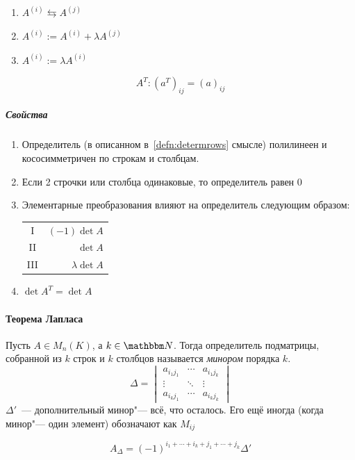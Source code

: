\documentclass[12pt]{../../../notes}
\begin{document}
\begin{defn}\label{defn:elemtranf}
  \noindent\newline\par
  \begin{enumerate}[I]
    \item\label{it:transfchng}    
      $A^{(i)} \leftrightarrows A^{(j)}$     
    \item\label{it:transfaddmul}  
      $A^{(i)} := A^{(i)} + \lambda A^{(j)}$ 
    \item\label{it:transfmul}           
      $A^{(i)} := \lambda A^{(i)}$           
  \end{enumerate}
\end{defn}
\begin{defn}\label{defn:transpose}
  \[
    A^T \colon (a^T)_{ij} = (a)_{ij}
  \]
\end{defn}

\subparagraph{Свойства}
\begin{enumerate}
  \item Определитель (в описанном в~\ref{defn:determrows} смысле) полилинеен и кососимметричен по
    строкам и столбцам.
  \item Если 2 строчки или столбца одинаковые, то определитель равен 0
  \item Элементарные преобразования влияют на определитель следующим образом:\par
    \begin{tabular}{c|r}
      I   & $(-1)\det A$ \\
      II  & $\det A$     \\
      III & $\lambda \det A$
    \end{tabular}
  \item $\det A^T = \det A$
\end{enumerate}


\paragraph{Теорема Лапласа}
\begin{defn}[Минор]\label{defn:minor}
  Пусть $A\in M_n(K)$, а $k\in \N$. Тогда определитель подматрицы, собранной из $k$ строк и $k$
  столбцов называется \emph{минором} порядка $k$.
  \[
    \Delta = 
    \begin{vmatrix}
      a_{i_1j_1} & \cdots & a_{i_1j_k} \\
      \vdots & \ddots & \vdots \\
      a_{i_kj_1} & \cdots & a_{i_kj_k} 
    \end{vmatrix}
  \]
  $\Delta'$~--- дополнительный минор"--- всё, что осталось.
  Его ещё иногда (когда минор"--- один элемент) обозначают как $M_{ij}$
\end{defn}
\begin{defn}\label{defn:cofactor}
  \[
    A_\Delta = (-1)^{i_1 + \dotsb + i_k + j_1 + \dotsb + j_k} \Delta'
  \]
\end{defn}
\end{document}

